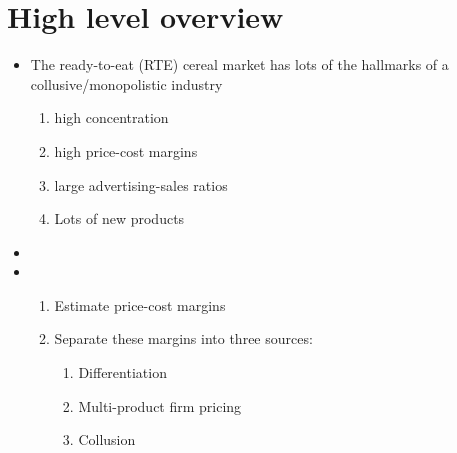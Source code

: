 



\section{High level overview}
\begin{itemize}
\item The ready-to-eat (RTE) cereal market has lots of the hallmarks of a collusive/monopolistic industry
  \begin{enumerate}
  \item high concentration
  \item high price-cost margins
  \item large advertising-sales ratios
    \item Lots of new products
  \end{enumerate}
\item   {}
\item {}
  \begin{enumerate}
  \item Estimate price-cost margins
  \item Separate these margins into three sources:
    \begin{enumerate}
    \item Differentiation
    \item Multi-product firm pricing
      \item Collusion
    \end{enumerate}
  \end{enumerate}
\end{itemize}



